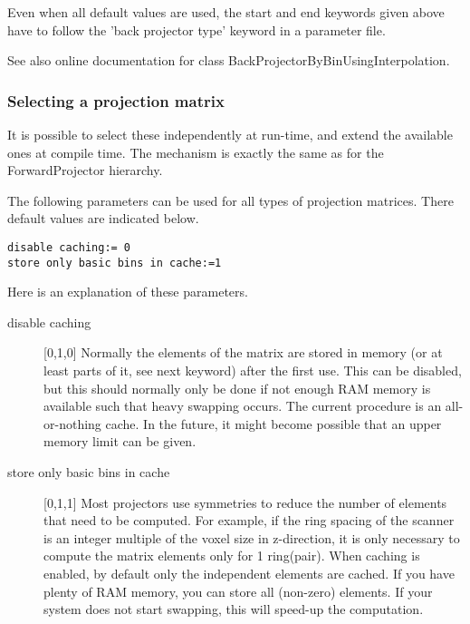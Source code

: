 \documentclass{article}
\begin{document}
Even when all default values are used, the start and end keywords 
given above have to follow the 'back projector type' keyword 
in a parameter file.


See also online documentation for class BackProjectorByBinUsingInterpolation.



\subsubsection{
Selecting a projection matrix}
\label{sec:projmatrix}
It is possible to select these independently at run-time, and 
extend the available ones at compile time. The mechanism is exactly 
the same as for the ForwardProjector hierarchy.

{ 
}
\label{sec:projmatrixcommon}
The following parameters can be used for all types of projection 
matrices. There default values are indicated below.

\begin{verbatim}
disable caching:= 0
store only basic bins in cache:=1
\end{verbatim}

Here is an explanation of these parameters.

\begin{description}
\item[disable caching] [0,1,0{]}
Normally the elements of the matrix are stored in memory (or 
at least parts of it, see next keyword) after the first use. 
This can be disabled, but this should normally only be done if 
not enough RAM memory is available such that heavy swapping occurs. 
The current procedure is an all-or-nothing cache. In the future, 
it might become possible that an upper memory limit can be given.


\item[store only basic bins in cache] [0,1,1{]}
Most projectors use symmetries to reduce the number of elements 
that need to be computed. For example, if the ring spacing of 
the scanner is an integer multiple of the voxel size in z-direction, 
it is only necessary to compute the matrix elements only for 
1 ring(pair). When caching is enabled, by default only the independent 
elements are cached. If you have plenty of RAM memory, you can 
store all (non-zero) elements. If your system does not start 
swapping, this will speed-up the computation.
\end{description}
\end{document}
